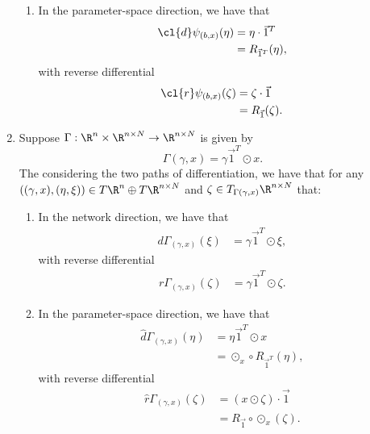 \begin{enumerate}
\begin{enumerate}
		\item In the parameter-space direction, we have that
		\begin{align*}
			\cl{d}\psi_{(b,x)}(\eta)&=\eta\cdot\vec{1}^T\\
			&=R_{\vec{1}^T}(\eta),
		\end{align*}
		with reverse differential
		\begin{align*}
			\cl{r}\psi_{(b,x)}(\zeta)&=\zeta\cdot\vec{1}\\
			&=R_{\vec{1}}(\zeta).
		\end{align*}
	\end{enumerate}
	
	\item Suppose $\Gamma:\R^n\times\R^{n\times N}\to\R^{n\times N}$ is given by
	$$\Gamma(\gamma,x)=\gamma\vec{1}^T\odot x.$$
	The considering the two paths of differentiation, we have that for any $((\gamma,x), (\eta,\xi))\in T\R^n\oplus T\R^{n\times N}$ and $\zeta\in T_{\Gamma(\gamma,x)}\R^{n\times N}$ that:
	\begin{enumerate}
		\item In the network direction, we have that
		\begin{align*}
			d\Gamma_{(\gamma,x)}(\xi)&=\gamma\vec{1}^T\odot\xi,
		\end{align*}
		with reverse differential
		\begin{align*}
			r\Gamma_{(\gamma,x)}(\zeta)&=\gamma\vec{1}^T\odot\zeta.
		\end{align*}
		
		\item In the parameter-space direction, we have that
		\begin{align*}
			\hat{d}\Gamma_{(\gamma,x)}(\eta)&=\eta\vec{1}^T\odot x\\
			&=\odot_x\circ R_{\vec{1}^T}(\eta),
		\end{align*}
		with reverse differential
		\begin{align*}
			\hat{r}\Gamma_{(\gamma,x)}(\zeta)&=(x\odot\zeta)\cdot\vec{1}\\
			&=R_{\vec{1}}\circ\odot_x(\zeta).
		\end{align*}
	\end{enumerate}
	

\end{enumerate}
